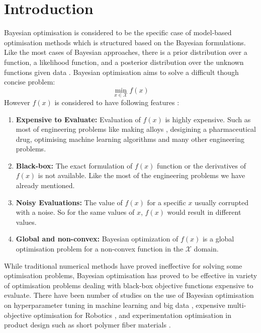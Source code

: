 \chapter{Introduction}
Bayesian optimisation is considered to be the specific case of model-based optimisation methods which is structured based on the Bayesian formulations. Like the most cases of Bayesian approaches, there is a prior distribution over a function, a likelihood function, and a posterior distribution over the unknown functions given data \cite{gelbart2015constrained}. Bayesian optimisation aims to solve a difficult though concise problem:
\begin{equation}
	\operatorname*{min}_{x \in \mathcal{X}} f(x)	
\label{eq:ch1_1}
\end{equation}
However $f(x)$ is considered to have following features \cite{gelbart2015constrained}:
\begin{enumerate}
\item \textbf{Expensive to Evaluate: } Evaluation of $f(x)$ is highly expensive. Such as most of engineering problems like making alloys \cite{vellanki2017process}, desigining a pharmaceutical drug, optimising machine learning algorithms \cite{snoek2012practical} and many other engineering problems.
\item \textbf{Black-box: } The exact formulation of $f(x)$ function or the derivatives of $f(x)$ is not available. Like the most of the engineering problems we have already mentioned.
\item \textbf{Noisy Evaluations: } The value of $f(x)$ for a specific $x$ usually corrupted with a noise. So for the same values of $x$, $f(x)$ would result in different values.
\item \textbf{Global and non-convex: } Bayesian optimization of $f(x)$ is a global optimisation problem for a non-convex function in the $\mathcal{X}$ domain.
\end{enumerate}
While traditional numerical methods have proved ineffective for solving some optimisation problems, Bayesian optimisation has proved to be effective in variety of optimisation problems dealing with black-box objective functions expensive to evaluate. There have been number of studies on the use of Bayesian optimisation on hyperparameter tuning in machine learning and big data \cite{joy2016hyperparameter}, expensive multi-objective optimisation for Robotics \cite{tesch2013expensive}, and experimentation optimisation in product design such as short polymer fiber materials \cite{li2017rapid}.
\par

